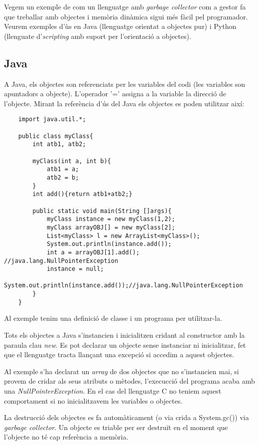 
Vegem un exemple de com un llenguatge amb \textit{garbage collector} com a gestor fa que treballar amb objectes i memòria dinàmica sigui més fàcil pel programador. Veurem exemples d'ùs en Java (llenguatge orientat a objectes pur) i Python (llenguate d'\textit{scripting} amb suport per l'orientació a objectes).

\subsection{Java}
A Java, els objectes son referenciats per les variables del codi (les variables son apuntadors a objecte). L'operador '=' assigna a la variable la direcció de l'objecte. Mirant la referència d'ús del Java  els objectes es poden utilitzar així:

\begin{verbatim}
    import java.util.*;
    
    public class myClass{
        int atb1, atb2;
        
        myClass(int a, int b){
            atb1 = a;
            atb2 = b;
        }  
        int add(){return atb1+atb2;} 

        public static void main(String []args){
            myClass instance = new myClass(1,2);
            myClass arrayOBJ[] = new myClass[2];
            List<myClass> l = new ArrayList<myClass>();
            System.out.println(instance.add());
            int a = arrayOBJ[1].add();  //java.lang.NullPointerException
            instance = null;
            System.out.println(instance.add());//java.lang.NullPointerException
        }
    }
\end{verbatim}  

Al exemple tenim una definició de classe i un programa per utilitzar-la. 

Tots els objectes a Java s'instancien i inicialitzen cridant al constructor amb la paraula clau \textit{new}. Es pot declarar un objecte sense instanciar ni inicialitzar, fet que el llenguatge tracta llançant una excepció si accedim a aquest objectes.

Al exemple s'ha declarat un \textit{array} de dos objectes que no s'instancien mai, si provem de cridar als seus atributs o mètodes, l'execucció del programa acaba amb una \textit{NullPointerException}. En el cas del llenguatge C no teniem aquest comportament si no inicialitzavem les variables o objectes.

La destrucció dels objectes es fa automàticament (o via crida a System.gc()) via \textit{garbage collector}. Un objecte es triable per ser destruït en el moment que l'objecte no té cap referència a memòria. 

